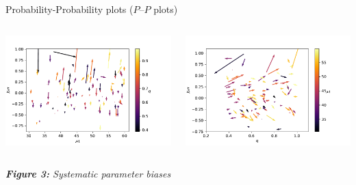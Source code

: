 \documentclass[serif]{beamer}
\begin{document}
\begin{frame}{}
\begin{columns}
\begin{column}[T]{0.35\textwidth}
\begin{block}{Probability-Probability plots ($P$--$P$ plots)}
  \begin{center}
    \begin{columns}
      \begin{column}{0.45\textwidth}
        \includegraphics[scale=1.5]{Images/2D_mc_xi_vector_plot}
      \end{column}
       
      \begin{column}{0.45\textwidth}
       \includegraphics[scale=1.5]{Images/2D_q_xi_vector_plot}
      \end{column}
    \end{columns}
  \small{\emph{\textbf{Figure 3:} Systematic parameter biases}}
   \end{center}



\end{block}
\end{column}
\end{columns}
\end{frame}
\end{document}
